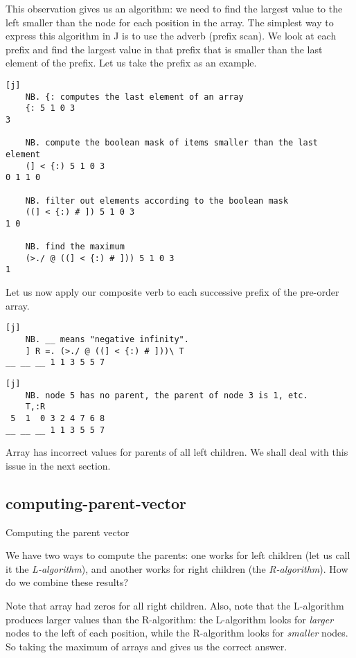 \documentclass{article}
\begin{document}
This observation gives us an algorithm: we need to find the largest value to the left smaller than the node for each position in the array.
The simplest way to express this algorithm in J is to use the \href{https://code.jsoftware.com/wiki/Vocabulary/bslash}{\code{\}}} adverb (prefix scan).
We look at each prefix and find the largest value in that prefix that is smaller than the last element of the prefix.
Let us take the prefix  as an example.

\begin{verbatim}[j]
    NB. {: computes the last element of an array
    {: 5 1 0 3
3

    NB. compute the boolean mask of items smaller than the last element
    (] < {:) 5 1 0 3
0 1 1 0

    NB. filter out elements according to the boolean mask
    ((] < {:) # ]) 5 1 0 3
1 0

    NB. find the maximum
    (>./ @ ((] < {:) # ])) 5 1 0 3
1
\end{verbatim}

Let us now apply our composite verb to each successive prefix of the pre-order array.

\begin{verbatim}[j]
    NB. __ means "negative infinity".
    ] R =. (>./ @ ((] < {:) # ]))\ T
__ __ __ 1 1 3 5 5 7
\end{verbatim}

\begin{verbatim}[j]
    NB. node 5 has no parent, the parent of node 3 is 1, etc.
    T,:R
 5  1  0 3 2 4 7 6 8
__ __ __ 1 1 3 5 5 7
\end{verbatim}

Array  has incorrect values for parents of all left children.
We shall deal with this issue in the next section.

\subsection{computing-parent-vector}{Computing the parent vector}

We have two ways to compute the parents: one works for left children (let us call it the \emph{L-algorithm}), and another works for right children (the \emph{R-algorithm}).
How do we combine these results?

Note that array  had zeros for all right children.
Also, note that the L-algorithm produces larger values than the R-algorithm: the L-algorithm looks for \emph{larger} nodes to the left of each position, while the R-algorithm looks for \emph{smaller} nodes.
So taking the maximum of arrays  and  gives us the correct answer.
\end{document}

